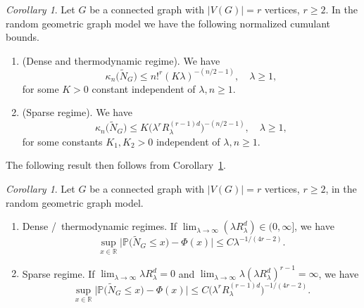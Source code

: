 \documentclass[bj,authoryear,noshowframe]{imsart}
\theoremstyle{plain}
\theoremstyle{remark}
\def\P{\mathbb{P}}
\def\real{{\mathord{\mathbb R}}}
\newtheorem{corollary}[prop]{Corollary}
\begin{document}
\begin{corollary}
    \label{thm8-0}
 Let $G$ be a connected graph with $|V(G)|=r$ vertices, $r\geq 2$.
 In the random geometric graph model we have the following
 normalized cumulant bounds.  
 \begin{enumerate}%
 \item (Dense and thermodynamic regime). 
   We have
   \begin{equation}
     \kappa_n\big(\widetilde{N}_G\big) \leq n!^r ( K \lambda )^{-(n/2-1)}, 
     \quad \lambda \geq 1,
   \end{equation}
for some $K>0$ constant independent of $\lambda , n\geq 1$. 
  \item (Sparse regime). 
   We have
   \begin{equation}
     \kappa_n\big(\widetilde{N}_G\big)\leq K \big(
      \lambda^r R_\lambda^{(r-1)d} \big)^{-(n/2-1)},
      \quad \lambda \geq 1,
   \end{equation}
for some constants $K_1, K_2 > 0$ independent of $\lambda , n\geq 1$. 
 \end{enumerate}
\end{corollary}
 The following result then follows from Corollary~\ref{thm8-0}. 
\begin{corollary}
  \label{jdkj10}
  Let $G$ be a connected graph with $|V(G)|=r$ vertices, $r\geq 2$,
  in the random geometric graph model.
  \begin{enumerate}%
    \item 
    Dense \!\! \slash \ thermodynamic regimes. 
  If $\lim_{\lambda\to\infty} (\lambda R_\lambda^d) \in (0,\infty]$, 
 we have
\begin{equation}
\nonumber
  \sup_{x\in \real}
\big| \P \big( \widetilde{N}_G \leq x \big) - \Phi(x) \big| \leq
C
\lambda^{-1/ ( 4r - 2) }.
\end{equation}
\item
  Sparse regime.
  If $\lim_{\lambda\to\infty} \lambda R_\lambda^d = 0$ and
  $\lim_{\lambda\to\infty} \lambda(\lambda R_\lambda^d)^{r-1} = \infty$,
  we have 
\begin{equation}
\sup_{x\in \real}
\big| \P \big( \widetilde{N}_G \leq x \big) - \Phi(x) \big| \leq
C
\big(\lambda^r R_\lambda^{(r-1)d}\big)^{-1/ ( 4r - 2) }.
\end{equation}
\end{enumerate}
\end{corollary}
\end{document}
